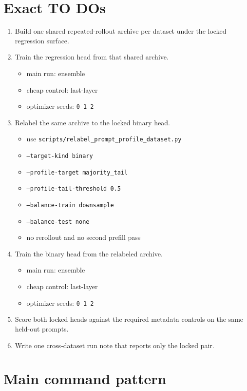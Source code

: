\documentclass[11pt]{article}
\begin{document}
\section*{Exact TO DOs}

\begin{enumerate}[leftmargin=1.5em]
\item Build one shared repeated-rollout archive per dataset under the locked regression surface.
\item Train the regression head from that shared archive.
  \begin{itemize}[leftmargin=1.5em]
  \item main run: ensemble
  \item cheap control: last-layer
  \item optimizer seeds: \texttt{0 1 2}
  \end{itemize}
\item Relabel the same archive to the locked binary head.
  \begin{itemize}[leftmargin=1.5em]
  \item use \texttt{scripts/relabel\_prompt\_profile\_dataset.py}
  \item \texttt{--target-kind binary}
  \item \texttt{--profile-target majority\_tail}
  \item \texttt{--profile-tail-threshold 0.5}
  \item \texttt{--balance-train downsample}
  \item \texttt{--balance-test none}
  \item no rerollout and no second prefill pass
  \end{itemize}
\item Train the binary head from the relabeled archive.
  \begin{itemize}[leftmargin=1.5em]
  \item main run: ensemble
  \item cheap control: last-layer
  \item optimizer seeds: \texttt{0 1 2}
  \end{itemize}
\item Score both locked heads against the required metadata controls on the same held-out prompts.
\item Write one cross-dataset run note that reports only the locked pair.
\end{enumerate}

\section*{Main command pattern}
\end{document}
